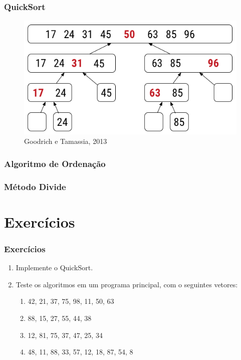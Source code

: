 \documentclass{beamer}
\begin{document}
\begin{frame}
    \frametitle{QuickSort}
    \begin{figure}
        \centering
        \includegraphics[scale=0.5]{images/vinda.png}
        \caption{Goodrich e Tamassia, 2013}
    \end{figure}
\end{frame}


\begin{frame}
	\frametitle{Algoritmo de Ordenação}
    \centering
    
\end{frame}

\begin{frame}
	\frametitle{Método Divide}
    \centering
    
\end{frame}

\section{Exercícios}

\begin{frame}
    \frametitle{Exercícios}

    \begin{enumerate}
        \item Implemente o QuickSort.
        \item Teste os algoritmos em um programa principal, com o seguintes vetores:
        \begin{enumerate}
            \item 42, 21, 37, 75, 98, 11, 50, 63
            \item 88, 15, 27, 55, 44, 38
            \item 12, 81, 75, 37, 47, 25, 34
            \item 48, 11, 88, 33, 57, 12, 18, 87, 54, 8
        \end{enumerate}
    \end{enumerate}
\end{frame}
\end{document}
